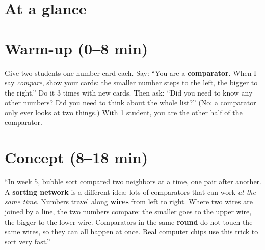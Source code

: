 \section{At a glance}
\begin{timeplan}
\end{timeplan}

\section{Warm-up (0--8 min)}
\begin{unplugged}
Give two students one number card each. Say: \enquote{You are a \textbf{comparator}. When I say \emph{compare}, show your cards: the smaller number steps to the left, the bigger to the right.} Do it 3 times with new cards. Then ask: \enquote{Did you need to know any other numbers? Did you need to think about the whole list?} (No: a comparator only ever looks at two things.) With 1 student, you are the other half of the comparator.
\end{unplugged}

\section{Concept (8--18 min)}
\begin{teacherscript}
\enquote{In week 5, bubble sort compared two neighbors at a time, one pair after another. A \textbf{sorting network} is a different idea: lots of comparators that can work \emph{at the same time}. Numbers travel along \textbf{wires} from left to right. Where two wires are joined by a line, the two numbers compare: the smaller goes to the upper wire, the bigger to the lower wire. Comparators in the same \textbf{round} do not touch the same wires, so they can all happen at once. Real computer chips use this trick to sort very fast.}
\end{teacherscript}

